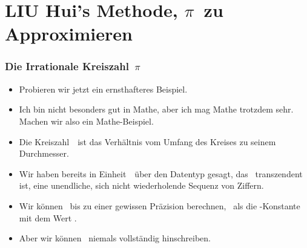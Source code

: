 \documentclass[aspectratio=169,mathserif,notheorems]{beamer}%
\begin{document}
\section{LIU Hui's Methode, $\pi$~zu Approximieren}%
%
\begin{frame}%
\frametitle{Die Irrationale Kreiszahl~$\pi$}%
\begin{itemize}%
\item Probieren wir jetzt ein ernsthafteres Beispiel.%
\item<2-> Ich bin nicht besonders gut in Mathe, aber ich mag Mathe trotzdem sehr. Machen wir also ein Mathe-Beispiel.%
\item<3-> Die Kreiszahl~\numberPi\ ist das Verhältnis vom Umfang des Kreises zu seinem Durchmesser.%
\item<4-> Wir haben bereits in Einheit~\unitFloat\ über den Datentyp  gesagt, das \numberPi\ transzendent ist, eine unendliche, sich nicht wiederholende Sequenz von Ziffern.%
\item<5-> Wir können \numberPi\ bis zu einer gewissen Präzision berechnen, \DEzB~als die -Konstante  mit dem Wert .%
\item<6-> Aber wir können \numberPi\ niemals vollständig hinschreiben.%
\end{itemize}%
\end{frame}%
%
\end{document}
